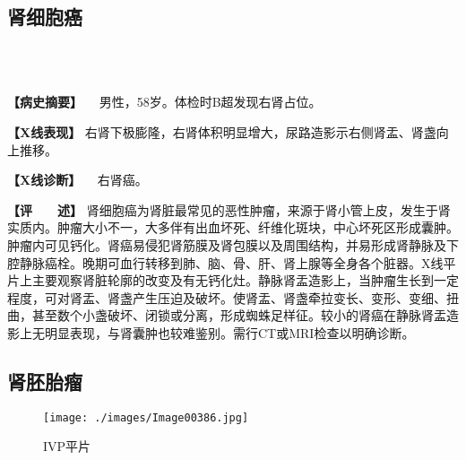 \subsection{肾细胞癌}

\begin{figure}
    \centering
    \\
    \\
    \caption{}
    \label{fig6-5-1}
\end{figure}

\textbf{【病史摘要】} 　男性，58岁。体检时B超发现右肾占位。

\textbf{【X线表现】}
右肾下极膨隆，右肾体积明显增大，尿路造影示右侧肾盂、肾盏向上推移。

\textbf{【X线诊断】} 　右肾癌。

\textbf{【评　　述】}
肾细胞癌为肾脏最常见的恶性肿瘤，来源于肾小管上皮，发生于肾实质内。肿瘤大小不一，大多伴有出血坏死、纤维化斑块，中心坏死区形成囊肿。肿瘤内可见钙化。肾癌易侵犯肾筋膜及肾包膜以及周围结构，并易形成肾静脉及下腔静脉癌栓。晚期可血行转移到肺、脑、骨、肝、肾上腺等全身各个脏器。X线平片上主要观察肾脏轮廓的改变及有无钙化灶。静脉肾盂造影上，当肿瘤生长到一定程度，可对肾盂、肾盏产生压迫及破坏。使肾盂、肾盏牵拉变长、变形、变细、扭曲，甚至数个小盏破坏、闭锁或分离，形成蜘蛛足样征。较小的肾癌在静脉肾盂造影上无明显表现，与肾囊肿也较难鉴别。需行CT或MRI检查以明确诊断。

\subsection{肾胚胎瘤}

\begin{figure}[!htbp]
    \centering
    \texttt{[image: ./images/Image00386.jpg]}
    \captionsetup{justification=centering}
    \caption{IVP平片}
    \label{fig6-5-2}
\end{figure}

